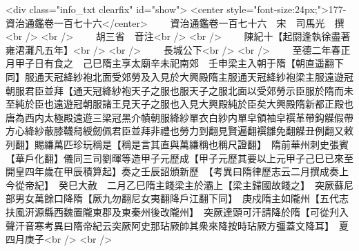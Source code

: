 <div class="info_txt clearfix" id="show">
<center style="font-size:24px;">177-資治通鑑卷一百七十六</center>
  　　資治通鑑卷一百七十六　宋　司馬光　撰<br />
<br />
　　胡三省　音注<br />
<br />
　　陳紀十【起閼逢執徐盡著雍涒灘凡五年】<br />
<br />
　　長城公下<br />
<br />
　　至德二年春正月甲子日有食之　己巳隋主享太廟辛未祀南郊　壬申梁主入朝于隋【朝直遥翻下同】服通天冠絳紗袍北面受郊勞及入見於大興殿隋主服通天冠絳紗袍梁主服遠遊冠朝服君臣並拜【通天冠絳紗袍天子之服也服天子之服北面以受郊勞示臣服於隋而未至純於臣也遠遊冠朝服諸王見天子之服也入見大興殿純於臣矣大興殿隋新都正殿也唐為西内太極殿遠遊三梁冠黑介幘朝服絳紗單衣白紗内單皁領袖皁襈革帶鈎䚢假帶方心絳紗蔽膝韈舄綬劒佩君臣並拜非禮也勞力到翻見賢遍翻襈雛免翻䚢丑例翻又敕列翻】賜縑萬匹珍玩稱是【稱是言其直與萬縑稱也稱尺證翻】　隋前華州刺史張賓【華戶化翻】儀同三司劉暉等造甲子元歷成【甲子元歷其要以上元甲子己巳已來至開皇四年歲在甲辰積算起】奏之壬辰詔頒新歷　【考異曰隋律歷志云二月撰成奏上今從帝紀】　癸巳大赦　二月乙巳隋主餞梁主於灞上【梁主歸國故餞之】　突厥蘇尼部男女萬餘口降隋【厥九勿翻尼女夷翻降戶江翻下同】　庚戍隋主如隴州【五代志扶風汧源縣西魏置隴東郡及東秦州後改隴州】　突厥達頭可汗請降於隋【可從刋入聲汗音寒考異曰隋帝紀云突厥阿史那玷厥帥其衆來降按時玷厥方彊蓋文降耳】　夏四月庚子<br />
<br />
